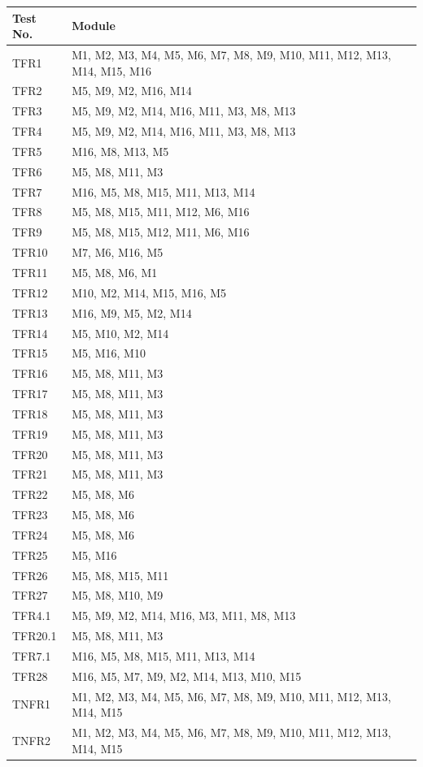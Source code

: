 \documentclass[12pt, titlepage]{article}
\begin{document}
\begin{longtable}{p{} p{}}
\toprule
\textbf{Test No.} & \textbf{Module}\\
\midrule
TFR1 & M1, M2, M3, M4, M5, M6, M7, M8, M9, M10, M11, M12, M13, M14, M15, M16\\
TFR2 & M5, M9, M2, M16, M14\\
TFR3 & M5, M9, M2, M14, M16, M11, M3, M8, M13\\
TFR4 & M5, M9, M2, M14, M16, M11, M3, M8, M13\\
TFR5 & M16, M8, M13, M5\\
TFR6 & M5, M8, M11, M3\\
TFR7 & M16, M5, M8, M15, M11, M13, M14\\
TFR8 & M5, M8, M15, M11, M12, M6, M16\\
TFR9 & M5, M8, M15, M12, M11, M6, M16\\
TFR10 & M7, M6, M16, M5\\
TFR11 & M5, M8, M6, M1\\
TFR12 & M10, M2, M14, M15, M16, M5\\
TFR13 & M16, M9, M5, M2, M14\\
TFR14 & M5, M10, M2, M14\\
TFR15 & M5, M16, M10\\
TFR16 & M5, M8, M11, M3\\
TFR17 & M5, M8, M11, M3\\
TFR18 & M5, M8, M11, M3\\
TFR19 & M5, M8, M11, M3\\
TFR20 & M5, M8, M11, M3\\
TFR21 & M5, M8, M11, M3\\
TFR22 & M5, M8, M6\\
TFR23 & M5, M8, M6\\
TFR24 & M5, M8, M6\\
TFR25 & M5, M16\\
TFR26 & M5, M8, M15, M11\\
TFR27 & M5, M8, M10, M9\\
TFR4.1 & M5, M9, M2, M14, M16, M3, M11, M8, M13\\
TFR20.1 & M5, M8, M11, M3\\
TFR7.1 & M16, M5, M8, M15, M11, M13, M14\\
TFR28 & M16, M5, M7, M9, M2, M14, M13, M10, M15\\
TNFR1 & M1, M2, M3, M4, M5, M6, M7, M8, M9, M10, M11, M12, M13, M14, M15\\
TNFR2 & M1, M2, M3, M4, M5, M6, M7, M8, M9, M10, M11, M12, M13, M14, M15\\

\end{longtable}
\end{document}
